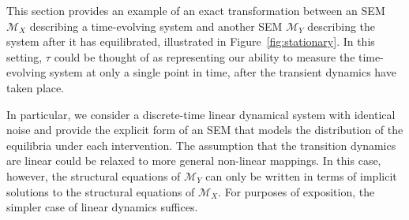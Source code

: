 This section provides an example of an exact transformation between an SEM $\mathcal{M}_X$ describing a time-evolving system and another SEM $\mathcal{M}_Y$ describing the system after it has equilibrated, illustrated in Figure~\ref{fig:stationary}. 
In this setting, $\tau$ could be thought of as representing our ability to measure the time-evolving system at only a single point in time, after the transient dynamics have taken place.

In particular, we consider a discrete-time linear dynamical system with identical noise and provide the explicit form of an SEM that models the distribution of the equilibria under each intervention.
The assumption that the transition dynamics are linear could be relaxed to more general non-linear mappings. 
In this case, however, the structural equations of $\mathcal{M}_Y$ can only be written in terms of implicit solutions to the structural equations of $\mathcal{M}_X$. 
For purposes of exposition, the simpler case of linear dynamics suffices.

\medskip


